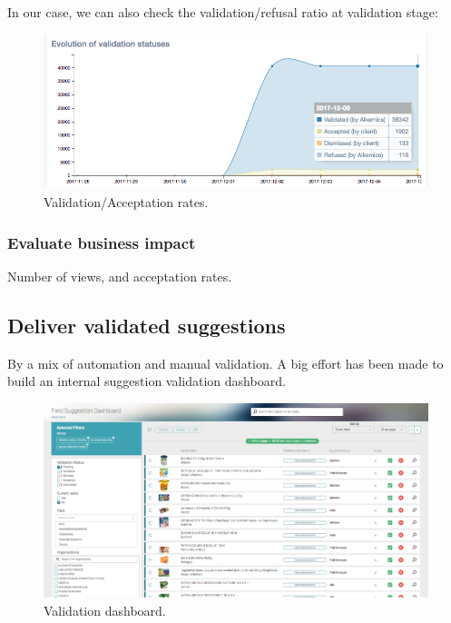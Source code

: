 In our case, we can also check the validation/refusal ratio at validation stage:

\begin{figure}[H]
\centering
\includegraphics[scale=0.5]{./images/monitoring/validation-acceptation-monitoring.png}
\caption{Validation/Acceptation rates.}
\end{figure}

\subsubsection{Evaluate business impact}

Number of views, and acceptation rates.

\subsection{Deliver validated suggestions}

By a mix of automation and manual validation.
A big effort has been made to build an internal suggestion validation dashboard. 

\begin{figure}[H]
\centering
\includegraphics[scale=0.54]{./images/data-quality/validation-dashboard.png}
\caption{Validation dashboard.}
\end{figure}

